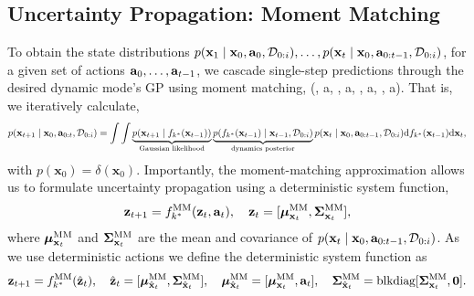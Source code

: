 \documentclass[twoside]{article}
\newcommand{\numData}{\ensuremath{t}}
\newcommand{\state}{\ensuremath{\mathbf{x}}}
\newcommand{\x}{\ensuremath{\mathbf{x}}}
\newcommand{\dataset}{\ensuremath{\mathcal{D}}}
\newcommand{\singleInput}{\ensuremath{\x_{\numData-1}}}
\begin{document}
\subsection{Uncertainty Propagation: Moment Matching \label{sec-moment-matching}}
\label{sec:orgad122c5}
To obtain the state distributions \(p(\state_{1} \mid \state_{0}, \action_{0}, \mathcal{D}_{0:i}),\ldots, p(\state_{\TimeInd} \mid \state_{0}, \action_{0:\TimeInd-1}, \mathcal{D}_{0:i})\),
for a given set of actions \(\mathbf{a}_{0},\ldots,\mathbf{a}_{\relax{\ensuremath{t}}-1}\),
we cascade single-step predictions through the desired dynamic mode's GP using moment matching,
(, a, , a, , a, , a).
That is, we iteratively calculate,
\begin{align}
p(\state_{\timeInd+1} \mid \state_{0}, \action_{0:\timeInd}, \mathcal{D}_{0:i}) = \int \int
\underbrace{p(\state_{\timeInd+1} \mid \dynamicsFunc_{\desiredMode}(\singleInput))}_{\text{Gaussian likelihood}}
\underbrace{p(\dynamicsFunc_{\desiredMode}(\singleInput) \mid \singleInput, \dataset_{0:i})}_{\text{dynamics posterior}}
p(\state_{\timeInd} \mid \state_{0}, \action_{0:\timeInd-1}, \mathcal{D}_{0:i})
\text{d} \dynamicsFunc_{\desiredMode}(\singleInput)
\text{d} \state_{\timeInd},
\end{align}
with \(p(\state_{0}) = \delta(\state_{0})\).
Importantly, the moment-matching approximation allows us to formulate uncertainty propagation using a deterministic
system function,
\begin{align}
\mathbf{z}_{\timeInd+1} = \dynamicsFunc_{\desiredMode}^{\text{MM}}(\mathbf{z}_{\timeInd}, \action_{\timeInd}),
\quad \mathbf{z}_{\timeInd} = [\bm\mu_{\state_{\timeInd}}^{\text{MM}}, \bm\Sigma_{\state_{\timeInd}}^{\text{MM}}],
\end{align}
where \(\bm\mu_{\state_{\timeInd}}^{\text{MM}}\) and \(\bm\Sigma_{\state_{\timeInd}}^{\text{MM}}\) are the mean and covariance of
\(p(\state_{\timeInd} \mid \state_{0}, \action_{0:\timeInd-1}, \mathcal{D}_{0:i})\).
As we use deterministic actions we define the deterministic system function as
\begin{align} \label{eq-moment-matching-system-function}
\mathbf{z}_{\timeInd+1} = \dynamicsFunc_{\desiredMode}^{\text{MM}}(\hat{\mathbf{z}}_{\timeInd}),
\quad \hat{\mathbf{z}}_{\timeInd} = [\bm\mu_{\hat{\state}_{\timeInd}}^{\text{MM}}, \bm\Sigma_{\hat{\state}_{\timeInd}}^{\text{MM}}],
\quad \bm\mu_{\hat{\state}_{\timeInd}}^{\text{MM}} = [\bm\mu_{\state_{\timeInd}}^{\text{MM}}, \action_{\timeInd}],
\quad \bm\Sigma_{\hat{\state}_{\timeInd}}^{\text{MM}} = \text{blkdiag}[\bm\Sigma_{\state_{\timeInd}}^{\text{MM}}, \bm0].
\end{align}
\end{document}
